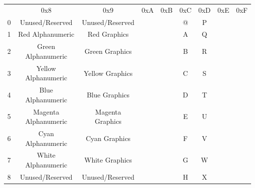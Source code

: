 \begin{table}
\begin{tabular}{|c|c|c|c|c|c|c|c|c|}\hline
   &0x8            & 0x9               		& 0xA&0xB&0xC& 0xD         &0xE& 0xF         \\
 0 &Unused/Reserved&Unused/Reserved    		& \sepsix{\bb}{\bb}{\bb}{\bb}{\bb}{\bb} & \sepsix{\bb}{\bb}{\bb}{\bb}{\ff}{\bb} & @ & P           & \sepsix{\bb}{\bb}{\bb}{\bb}{\bb}{\ff} & \sepsix{\bb}{\bb}{\bb}{\bb}{\ff}{\ff}\\
 1 &Red Alphanumeric       &Red Graphics	& \sepsix{\ff}{\bb}{\bb}{\bb}{\bb}{\bb} & \sepsix{\ff}{\bb}{\bb}{\bb}{\ff}{\bb} & A & Q           & \sepsix{\ff}{\bb}{\bb}{\bb}{\bb}{\ff} & \sepsix{\ff}{\bb}{\bb}{\bb}{\ff}{\ff}\\
 2 &Green Alphanumeric     &Green Graphics	& \sepsix{\bb}{\ff}{\bb}{\bb}{\bb}{\bb} & \sepsix{\bb}{\ff}{\bb}{\bb}{\ff}{\bb} & B & R           & \sepsix{\bb}{\ff}{\bb}{\bb}{\bb}{\ff} & \sepsix{\bb}{\ff}{\bb}{\bb}{\ff}{\ff}\\
 3 &Yellow Alphanumeric    &Yellow Graphics	& \sepsix{\ff}{\ff}{\bb}{\bb}{\bb}{\bb} & \sepsix{\ff}{\ff}{\bb}{\bb}{\ff}{\bb} & C & S           & \sepsix{\ff}{\ff}{\bb}{\bb}{\bb}{\ff} & \sepsix{\ff}{\ff}{\bb}{\bb}{\ff}{\ff}\\
 4 &Blue   Alphanumeric    &Blue   Graphics	& \sepsix{\bb}{\bb}{\ff}{\bb}{\bb}{\bb} & \sepsix{\bb}{\bb}{\ff}{\bb}{\ff}{\bb} & D & T           & \sepsix{\bb}{\bb}{\ff}{\bb}{\bb}{\ff} & \sepsix{\bb}{\bb}{\ff}{\bb}{\ff}{\ff}\\
 5 &Magenta Alphanumeric   &Magenta Graphics	& \sepsix{\ff}{\bb}{\ff}{\bb}{\bb}{\bb} & \sepsix{\ff}{\bb}{\ff}{\bb}{\ff}{\bb} & E & U           & \sepsix{\ff}{\bb}{\ff}{\bb}{\bb}{\ff} & \sepsix{\ff}{\bb}{\ff}{\bb}{\ff}{\ff}\\
 6 &Cyan Alphanumeric      &Cyan Graphics	& \sepsix{\bb}{\ff}{\ff}{\bb}{\bb}{\bb} & \sepsix{\bb}{\ff}{\ff}{\bb}{\ff}{\bb} & F & V           & \sepsix{\bb}{\ff}{\ff}{\bb}{\bb}{\ff} & \sepsix{\bb}{\ff}{\ff}{\bb}{\ff}{\ff}\\
 7 &White Alphanumeric     &White Graphics	& \sepsix{\ff}{\ff}{\ff}{\bb}{\bb}{\bb} & \sepsix{\ff}{\ff}{\ff}{\bb}{\ff}{\bb} & G & W           & \sepsix{\ff}{\ff}{\ff}{\bb}{\bb}{\ff} & \sepsix{\ff}{\ff}{\ff}{\bb}{\ff}{\ff}\\
 8 &Unused/Reserved&Unused/Reserved		& \sepsix{\bb}{\bb}{\bb}{\ff}{\bb}{\bb} & \sepsix{\bb}{\bb}{\bb}{\ff}{\ff}{\bb} & H & X           & \sepsix{\bb}{\bb}{\bb}{\ff}{\bb}{\ff} & \sepsix{\bb}{\bb}{\bb}{\ff}{\ff}{\ff}\\

\end{tabular}
\end{table}
